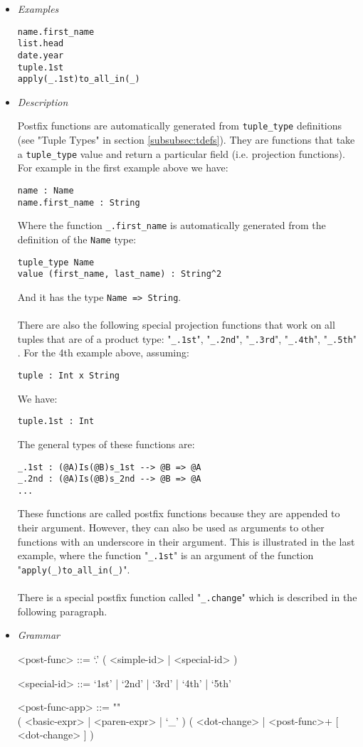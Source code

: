 \documentclass[diploma]{softlab-thesis}
\begin{document}
\begin{itemize}

\item \textit{Examples}
\begin{verbatim}
name.first_name
list.head
date.year
tuple.1st
apply(_.1st)to_all_in(_)
\end{verbatim}

\item \textit{Description}

Postfix functions are automatically generated from \verb|tuple_type|
definitions (see "Tuple Types" in section \ref{subsubsec:tdefs}). They are
functions that take a \verb|tuple_type| value and return a particular field
(i.e. projection functions). For example in the first example above we have:
\begin{verbatim}
name : Name
name.first_name : String
\end{verbatim}
Where the function \verb|_.first_name| is automatically generated from the
definition of the \verb|Name| type:
\begin{verbatim}
tuple_type Name
value (first_name, last_name) : String^2
\end{verbatim}
And it has the type \verb|Name => String|.
\\\\
There are also the following special projection functions that work on all
tuples that are of a product type:
"\verb|_.1st|", "\verb|_.2nd|", "\verb|_.3rd|", "\verb|_.4th|", "\verb|_.5th|"
.
For the 4th example above, assuming:
\begin{verbatim}
tuple : Int x String
\end{verbatim}
We have:
\begin{verbatim}
tuple.1st : Int
\end{verbatim}
The general types of these functions are:
\begin{verbatim}
_.1st : (@A)Is(@B)s_1st --> @B => @A
_.2nd : (@A)Is(@B)s_2nd --> @B => @A
...
\end{verbatim}
These functions are called postfix functions because they are appended to their
argument. However, they can also be used as arguments to other functions with
an underscore in their argument. This is illustrated in the last example, where
the function "\verb|_.1st|" is an argument of the function
"\verb|apply(_)to_all_in(_)|".
\\\\
There is a special postfix function called "\verb|_.change|" which is described
in the following paragraph.

\newpage
\item \textit{Grammar}
\begin{grammar}
<post-func> ::= `.' ( <simple-id> | <special-id> )

<special-id> ::= `1st' | `2nd' | `3rd' | `4th' | `5th'

<post-func-app> ::= ""\\
( <basic-expr> | <paren-expr> | `_' )
( <dot-change> | <post-func>+ [ <dot-change> ] )
\end{grammar}

\end{itemize}
\end{document}
